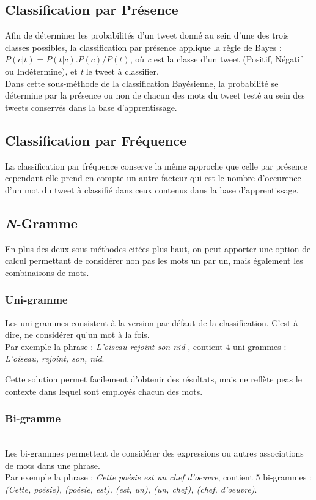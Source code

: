 \documentclass[pdftex,12pt,a4paper]{report}
\begin{document}
\begin{spacing}{1.2}
\subsection{Classification par Présence}

Afin de déterminer les probabilités d'un tweet donné au sein d'une des trois classes possibles, la classification par présence applique la règle de Bayes : $ P(\textit{c} | \textit{t}) = P(\textit{t} | \textit{c}) . P(\textit{c}) / P(\textit{t})$, où \textit{c} est la classe d'un tweet (Positif, Négatif ou Indétermine), et \textit{t} le tweet à classifier.
\\
Dans cette sous-méthode de la classification Bayésienne, la probabilité se détermine par la présence ou non de chacun des mots du tweet testé au sein des tweets conservés dans la base d'apprentissage.

\subsection{Classification par Fréquence}

La classification par fréquence conserve la même approche que celle par présence cependant elle prend en compte un autre facteur qui est le nombre d'occurence d'un mot du tweet à classifié dans ceux contenus dans la base d'apprentissage.

\subsection{\textit{N}-Gramme}

En plus des deux sous méthodes citées plus haut, on peut apporter une option de calcul permettant de considérer non pas les mots un par un, mais également les combinaisons de mots.

\subsubsection{Uni-gramme}
Les uni-grammes consistent à la version par défaut de la classification. C'est à dire, ne considérer qu'un mot à la fois.\\
Par exemple la phrase : \textit{L'oiseau rejoint son nid} , contient 4 uni-grammes : \textit{L'oiseau, rejoint, son, nid}.

Cette solution permet facilement d'obtenir des résultats, mais ne reflète peas le contexte dans lequel sont employés chacun des mots.

\subsubsection{Bi-gramme}
\\
Les bi-grammes permettent de considérer des expressions ou autres associations de mots dans une phrase.
\\
Par exemple la phrase : \textit{Cette poésie est un chef d'oeuvre}, contient 5 bi-grammes : \textit{(Cette, poésie), (poésie, est), (est, un), (un, chef), (chef, d'oeuvre)}.


\end{spacing}
\end{document}

